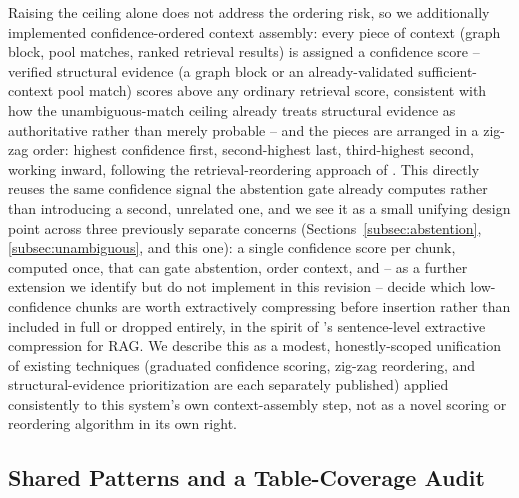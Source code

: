 \documentclass[a4paper,twoside]{article}
\begin{document}
Raising the ceiling alone does not address the ordering risk, so we additionally implemented confidence-ordered context assembly: every piece of context (graph block, pool matches, ranked retrieval results) is assigned a confidence score -- verified structural evidence (a graph block or an already-validated sufficient-context pool match) scores above any ordinary retrieval score, consistent with how the unambiguous-match ceiling already treats structural evidence as authoritative rather than merely probable -- and the pieces are arranged in a zig-zag order: highest confidence first, second-highest last, third-highest second, working inward, following the retrieval-reordering approach of \citet{jin2024longcontext}. This directly reuses the same confidence signal the abstention gate already computes rather than introducing a second, unrelated one, and we see it as a small unifying design point across three previously separate concerns (Sections~\ref{subsec:abstention}, \ref{subsec:unambiguous}, and this one): a single confidence score per chunk, computed once, that can gate abstention, order context, and -- as a further extension we identify but do not implement in this revision -- decide which low-confidence chunks are worth extractively compressing before insertion rather than included in full or dropped entirely, in the spirit of \citet{exit2025}'s sentence-level extractive compression for RAG. We describe this as a modest, honestly-scoped unification of existing techniques (graduated confidence scoring, zig-zag reordering, and structural-evidence prioritization are each separately published) applied consistently to this system's own context-assembly step, not as a novel scoring or reordering algorithm in its own right.

\subsection{Shared Patterns and a Table-Coverage Audit}
\label{subsec:patterns-refactor}
\end{document}
